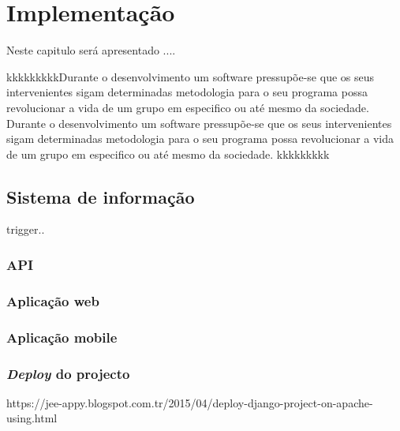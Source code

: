 



\chapter{Implementação}

Neste capitulo será apresentado ....

kkkkkkkkkDurante o desenvolvimento um software pressupõe-se que os seus intervenientes sigam determinadas metodologia para o seu programa possa revolucionar a vida de um grupo em especifico ou até mesmo da sociedade. 
Durante o desenvolvimento um software pressupõe-se que os seus intervenientes sigam determinadas metodologia para o seu programa possa revolucionar a vida de um grupo em especifico ou até mesmo da sociedade. kkkkkkkkk


















\section{Sistema de informação}


trigger..



\subsection{\ac{API}}

\subsection{Aplicação web}





\subsection{Aplicação mobile}




\subsection{\textit{Deploy} do projecto}


https://jee-appy.blogspot.com.tr/2015/04/deploy-django-project-on-apache-using.html

